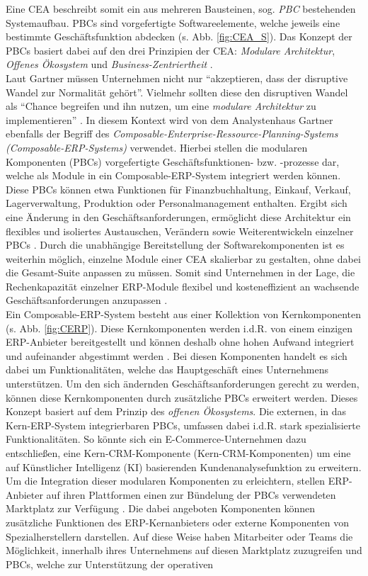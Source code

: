 Eine CEA beschreibt somit ein aus mehreren Bausteinen, sog. \textit{\ac{PBC}} bestehenden Systemaufbau. PBCs sind vorgefertigte Softwareelemente, welche jeweils eine bestimmte Geschäftsfunktion abdecken (s. Abb. \ref{fig:CEA_S}). Das Konzept der PBCs basiert dabei auf den drei Prinzipien der CEA: \textit{Modulare Architektur}, \textit{Offenes Ökosystem} und \textit{Business-Zentriertheit} \cite{.20230313}.\\ Laut Gartner müssen Unternehmen nicht nur \enquote{akzeptieren, dass der disruptive Wandel zur Normalität gehört}. Vielmehr sollten diese den disruptiven Wandel als \enquote{Chance begreifen und ihn nutzen, um eine \textit{modulare Architektur} zu implementieren} \cite{.20230313}. In diesem Kontext wird von dem Analystenhaus Gartner ebenfalls der Begriff des \textit{Composable-Enterprise-Ressource-Planning-Systems (Composable-\acs{ERP}-Systems)} verwendet. Hierbei stellen die modularen Komponenten (PBCs) vorgefertigte Geschäftsfunktio\-nen- bzw. -prozesse dar, welche als Module in ein Composable-ERP-System integriert werden können. Diese PBCs können etwa Funktionen für Finanzbuchhaltung, Einkauf, Verkauf, Lagerverwaltung, Produktion oder Personalmanagement enthalten. Ergibt sich eine Änderung in den Geschäftsanforderungen, ermöglicht diese Architektur ein flexibles und isoliertes Austauschen, Verändern sowie Weiterentwickeln einzelner PBCs \cite{Gartner.20230418}. Durch die unabhängige Bereitstellung der Softwarekomponenten ist es weiterhin möglich, einzelne Module einer CEA skalierbar zu gestalten, ohne dabei die Gesamt-Suite anpassen zu müssen. Somit sind Unternehmen in der Lage, die Rechenkapazität einzelner ERP-Module flexibel und kosteneffizient an wachsende Geschäftsanforderungen anzupassen \cite[7]{Sensedia.2020}.\\ Ein Composable-ERP-System besteht aus einer Kollektion von Kernkomponenten (s. Abb. \ref{fig:CERP}). Diese Kernkomponenten werden i.d.R. von einem einzigen ERP-Anbieter bereitgestellt und können deshalb ohne hohen Aufwand integriert und aufeinander abgestimmt werden \cite{.d}. Bei diesen Komponenten handelt es sich dabei um Funktionalitäten, welche das Hauptgeschäft eines Unternehmens unterstützen. Um den sich ändernden Geschäftsanforderungen gerecht zu werden, können diese Kernkomponenten durch zusätzliche PBCs erweitert werden. Dieses Konzept basiert auf dem Prinzip des \textit{offenen Ökosystems}. Die externen, in das Kern-ERP-System integrierbaren PBCs, umfassen dabei i.d.R. stark spezialisierte Funktionalitäten. So könnte sich ein E-Commerce-Unternehmen dazu entschließen, eine Kern-\acl{CRM}-Komponente (Kern-CRM-Komponenten) um eine auf Kün\-stlicher Intelligenz (\acs{KI}) basierenden Kundenanalysefunktion zu erweitern. Um die Integration dieser modularen Komponenten zu erleichtern, stellen ERP-Anbieter auf ihren Plattformen einen zur Bündelung der PBCs verwendeten Marktplatz zur Verfügung \cite{.d}. Die dabei angeboten Komponenten können zusätzliche Funktionen des ERP-Kern\-anbieters oder externe Komponenten von Spezialherstellern darstellen. Auf diese Weise haben Mitarbeiter oder Teams die Möglichkeit, innerhalb ihres Unternehmens auf diesen Marktplatz zuzugreifen und PBCs, welche zur Unterstützung der operativen 